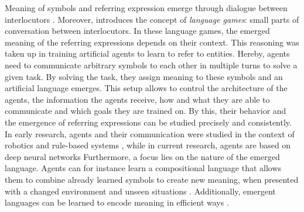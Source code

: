 Meaning of symbols and referring expression emerge through dialogue between interlocutors \citep{Wittgenstein1953,Clark1986}.
Moreover, \citet{Wittgenstein1953} introduces the concept of \emph{language games}: small parts of conversation between interlocutors.
In these language games, the emerged meaning of the referring expressions depends on their context.
This reasoning was taken up in training artificial agents to learn to refer to entities.
Hereby, agents need to communicate arbitrary symbols to each other in multiple turns to solve a given task.
By solving the task, they assign meaning to these symbols and an artificial language emerges.
This setup allows to control the architecture of the agents, the information the agents receive, how and what they are able to communicate and which goals they are trained on.
By this, their behavior and the emergence of referring expressions can be studied precisely and consistently.
In early research, agents and their communication were studied in the context of robotics and rule-based systems \citep{Steels2009,Roy2002,Kirby2002,Kirby2008}, while in current research, agents are based on deep neural networks \citep{Lazaridou2017,Baroni2020,Baroni2022,Kottur2017}
Furthermore, a focus lies on the nature of the emerged language.
Agents can for instance learn a compositional language that allows them to combine already learned symbols to create new meaning, when presented with a changed environment and unseen situations \citep{Kharitonov2020,Lazaridou2018,Gupta2020}.
Additionally, emergent languages can be learned to encode meaning in efficient ways \citep{Chaabouni2019,Zaslavsky2018}.

